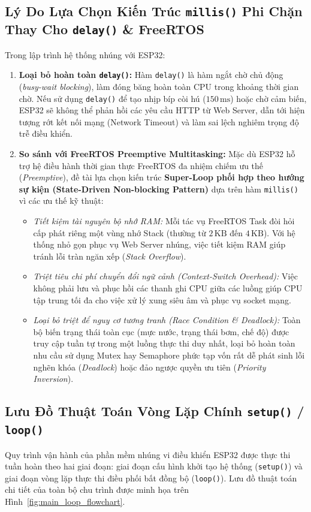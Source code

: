 \subsection{Lý Do Lựa Chọn Kiến Trúc \texttt{millis()} Phi Chặn Thay Cho \texttt{delay()} \& FreeRTOS}
Trong lập trình hệ thống nhúng với ESP32:
\begin{enumerate}
    \item \textbf{Loại bỏ hoàn toàn \texttt{delay()}:} Hàm \texttt{delay()} là hàm ngắt chờ chủ động (\textit{busy-wait blocking}), làm đóng băng hoàn toàn CPU trong khoảng thời gian chờ. Nếu sử dụng \texttt{delay()} để tạo nhịp bíp còi hú ($150\,\text{ms}$) hoặc chờ cảm biến, ESP32 sẽ không thể phản hồi các yêu cầu HTTP từ Web Server, dẫn tới hiện tượng rớt kết nối mạng (Network Timeout) và làm sai lệch nghiêm trọng độ trễ điều khiển.
    \item \textbf{So sánh với FreeRTOS Preemptive Multitasking:}
    Mặc dù ESP32 hỗ trợ hệ điều hành thời gian thực FreeRTOS đa nhiệm chiếm ưu thế (\textit{Preemptive}), đề tài lựa chọn kiến trúc \textbf{Super-Loop phối hợp theo hướng sự kiện (State-Driven Non-blocking Pattern)} dựa trên hàm \texttt{millis()} vì các ưu thế kỹ thuật:
    \begin{itemize}
        \item \textit{Tiết kiệm tài nguyên bộ nhớ RAM:} Mỗi tác vụ FreeRTOS Task đòi hỏi cấp phát riêng một vùng nhớ Stack (thường từ $2\,\text{KB}$ đến $4\,\text{KB}$). Với hệ thống nhỏ gọn phục vụ Web Server nhúng, việc tiết kiệm RAM giúp tránh lỗi tràn ngăn xếp (\textit{Stack Overflow}).
        \item \textit{Triệt tiêu chi phí chuyển đổi ngữ cảnh (\textit{Context-Switch Overhead}):} Việc không phải lưu và phục hồi các thanh ghi CPU giữa các luồng giúp CPU tập trung tối đa cho việc xử lý xung siêu âm và phục vụ socket mạng.
        \item \textit{Loại bỏ triệt để nguy cơ tương tranh (\textit{Race Condition \& Deadlock}):} Toàn bộ biến trạng thái toàn cục (mực nước, trạng thái bơm, chế độ) được truy cập tuần tự trong một luồng thực thi duy nhất, loại bỏ hoàn toàn nhu cầu sử dụng Mutex hay Semaphore phức tạp vốn rất dễ phát sinh lỗi nghẽn khóa (\textit{Deadlock}) hoặc đảo ngược quyền ưu tiên (\textit{Priority Inversion}).
    \end{itemize}
\end{enumerate}

\subsection{Lưu Đồ Thuật Toán Vòng Lặp Chính \texttt{setup()} / \texttt{loop()}}
Quy trình vận hành của phần mềm nhúng vi điều khiển ESP32 được thực thi tuần hoàn theo hai giai đoạn: giai đoạn cấu hình khởi tạo hệ thống (\texttt{setup()}) và giai đoạn vòng lặp thực thi điều phối bất đồng bộ (\texttt{loop()}). Lưu đồ thuật toán chi tiết của toàn bộ chu trình được minh họa trên Hình~\ref{fig:main_loop_flowchart}.

